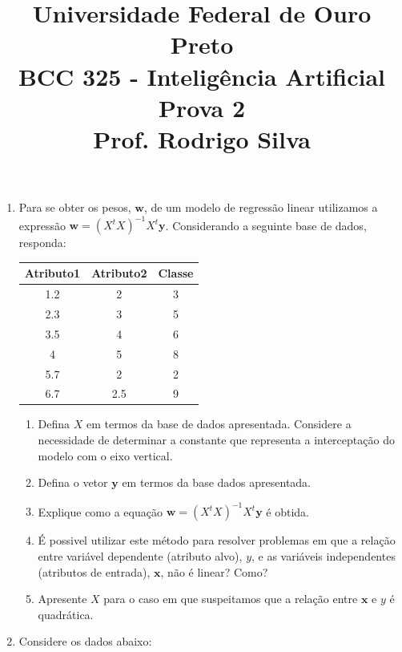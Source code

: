 \documentclass{article}
\title{\vspace{-2 cm} Universidade Federal de Ouro Preto \\ BCC 325 - Inteligência Artificial \\ Prova 2 \\ Prof. Rodrigo Silva}
\date{}
\begin{document}
\maketitle

\vspace{0.4 cm}
\begin{enumerate}



\item Para se obter os pesos, $\mathbf{w}$, de um modelo de regressão linear utilizamos a expressão  $\mathbf{w} = (X^{t}X)^{-1}X^t\mathbf{y}$. Considerando a seguinte base de dados, responda:

\begin{table}[h!]
    \footnotesize
    \centering
    \begin{tabular}{|c|c|c|}
    \hline
    \textbf{Atributo1} & \textbf{Atributo2} & \textbf{Classe} \\
    \hline
    1.2 & 2 & 3 \\
    2.3 & 3 & 5 \\
    3.5 & 4 & 6 \\
    4   & 5 & 8 \\
    5.7 & 2 & 2 \\
    6.7 & 2.5 & 9 \\
    \hline
    \end{tabular}
    \label{tab:exemplo}
\end{table}


\begin{enumerate}
    \item Defina $X$ em termos da base de dados apresentada. Considere a necessidade de determinar a constante que representa a interceptação do modelo com o eixo vertical.
    \item Defina o vetor $\mathbf{y}$ em termos da base dados apresentada.
    \item Explique como a equação $\mathbf{w} = (X^{t}X)^{-1}X^t\mathbf{y}$ é obtida.
    \item É possivel utilizar este método para resolver problemas em que a relação entre variável dependente (atributo alvo), $y$, e as variáveis independentes (atributos de entrada), $\mathbf{x}$, não é linear? Como?
    \item Apresente $X$ para o caso em que suspeitamos que a relação entre $\mathbf{x}$ e $y$ é quadrática.
\end{enumerate}

\item Considere os dados abaixo:


\end{enumerate}
\end{document}

